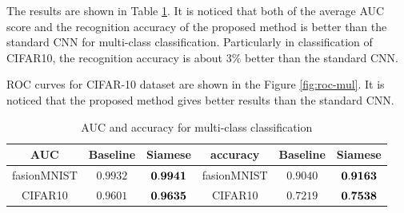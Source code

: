 \documentclass[runningheads,a4paper]{llncs}
\begin{document}
The results are shown in Table \ref{table:AUC_ACC_multi}.
It is noticed that both of the average AUC score and the recognition accuracy of the proposed method is better than the standard CNN for multi-class classification.
Particularly in classification of CIFAR10, the recognition accuracy is about 3$\%$ better than the standard CNN.


ROC curves for CIFAR-10 dataset are shown in the Figure \ref{fig:roc-mul}. 
It is noticed that the proposed method gives better results than the standard CNN.




\begin{table}[t]
\begin{center}
\caption{AUC and accuracy for multi-class classification}
\label{table:AUC_ACC_multi}
\begin{tabular}{|c|c|c||c|c|c|} \hline
AUC & Baseline & Siamese & accuracy &  Baseline & Siamese  \\ \hline \hline
fasionMNIST & $0.9932$    & ${\bf 0.9941}$  &  fasionMNIST  & $0.9040$   &  ${\bf 0.9163}$ \\ \hline
CIFAR10  & $0.9601$      &  ${\bf 0.9635}$     &  CIFAR10   & $0.7219$     &${\bf 0.7538}$ \\ \hline
\end{tabular}
\end{center}
\end{table}
\end{document}
